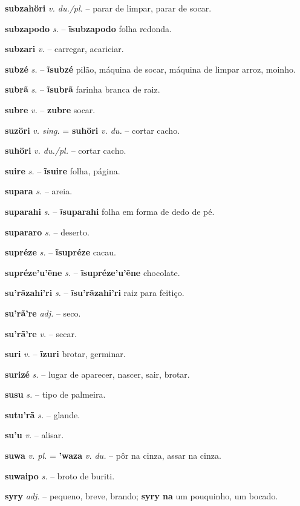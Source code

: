\textbf{subzahöri} \textit{v. du./pl.} -- parar de limpar, parar de socar.

\textbf{subzapodo} \textit{s.} -- \textbf{ĩsubzapodo} folha redonda.

\textbf{subzari} \textit{v.} -- carregar, acariciar.

\textbf{subzé} \textit{s.} -- \textbf{ĩsubzé} pilão, máquina de socar, máquina de limpar arroz, moinho.

\textbf{subrã} \textit{s.} -- \textbf{ĩsubrã} farinha branca de raiz.

\textbf{subre} \textit{v.} -- \textbf{zubre} socar.

\textbf{suzöri} \textit{v. sing.} = \textbf{suhöri} \textit{v. du.} -- cortar cacho.

\textbf{suhöri} \textit{v. du./pl.} -- cortar cacho.

\textbf{suire} \textit{s.} -- \textbf{ĩsuire} folha, página.

\textbf{supara} \textit{s.} -- areia.

\textbf{suparahi} \textit{s.} -- \textbf{ĩsuparahi} folha em forma de dedo de pé.

\textbf{supararo} \textit{s.} -- deserto.

\textbf{supréze} \textit{s.} -- \textbf{ĩsupréze} cacau.

\textbf{supréze'u'ẽne} \textit{s.} -- \textbf{ĩsupréze'u'ẽne} chocolate.

\textbf{su'rãzahi'ri} \textit{s.} -- \textbf{ĩsu'rãzahi'ri} raiz para feitiço.

\textbf{su'rã're} \textit{adj.} -- seco.

\textbf{su'rã're} \textit{v.} -- secar.

\textbf{suri} \textit{v.} -- \textbf{ĩzuri} brotar, germinar.

\textbf{surizé} \textit{s.} -- lugar de aparecer, nascer, sair, brotar.

\textbf{susu} \textit{s.} -- tipo de palmeira.

\textbf{sutu'rã} \textit{s.} -- glande.

\textbf{su'u} \textit{v.} -- alisar.

\textbf{suwa} \textit{v. pl.} = \textbf{'waza} \textit{v. du.} -- pôr na cinza, assar na cinza.

\textbf{suwaipo} \textit{s.} -- broto de buriti.

\textbf{syry} \textit{adj.} -- pequeno, breve, brando; \textbf{syry na} um pouquinho, um bocado.

